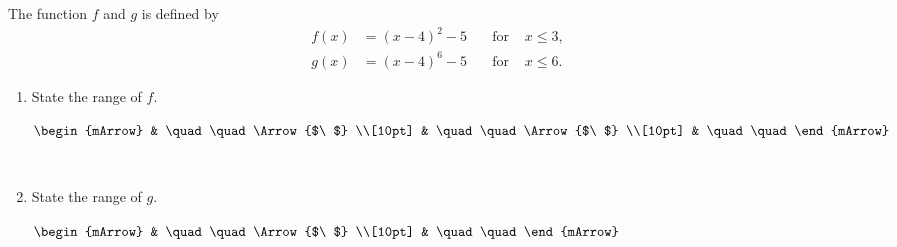 \clearpage\noindent%
\begin{mtask}[resume]
    \task The function $f$ and $g$ is defined by 
           \begin{align*}
               f(x) &= (x-4)^2 - 5 &  \quad \text{for } & x \leqslant 3, \\
               g(x) &= (x-4)^6 - 5 &  \quad \text{for } & x \leqslant 6.
            \end{align*}

		  \begin{enumerate}[label=(\alph*)]
		   \item  State the range of $f$.
		        \begin{envSolution}[height=3cm]
			       $\begin{mArrow}
			             &  \quad\quad      \Arrow{$\ $} \\[10pt]
			             &  \quad\quad      \Arrow{$\ $} \\[10pt]
                        &  \quad\quad	   
	                \end{mArrow}$
                \end{envSolution} 					
		  	    \begin{exercise}\begin{shortsolution}  
				       $ \quad\quad  $
			    \end{shortsolution}\end{exercise}

            \item State the range of $g$.
		        \begin{envSolution}[height=3cm]
			       $\begin{mArrow}
			             &  \quad\quad      \Arrow{$\ $} \\[10pt]
                         &  \quad\quad	   
	                \end{mArrow}$
                \end{envSolution} 			  
		  	    \begin{exercise}\begin{shortsolution}  
				       $ \quad\quad  $
			    \end{shortsolution}\end{exercise}

		    \end{enumerate}		
\end{mtask}
				

